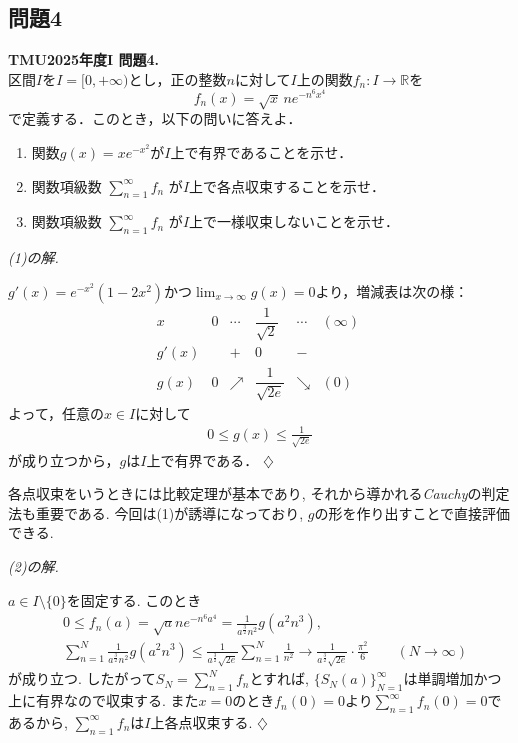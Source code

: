 \documentclass[titlepage]{jsarticle}
\numberwithin{equation}{section}
\newcommand{\R}{\mathbb{R}}%
\newenvironment{kaitou}[1][解]{%
\begin{proofbox}%
\textit{#1. }\ignorespaces
}{%
\hfill$\diamondsuit$%
\end{proofbox}%
}
\begin{document}
\subsection{問題4}
\begin{problem}
\textbf{TMU2025年度I 問題4.}\\
区間$I$を$I=[0,+\infty)$とし，正の整数$n$に対して$I$上の関数$f_n:I\to\R$を
\[
f_n(x)=\sqrt{x}\,n e^{-n^6x^4}
\]
で定義する．このとき，以下の問いに答えよ．

\begin{enumerate}[label=(\arabic*)]
    \item 関数$g(x)=xe^{-x^2}$が$I$上で有界であることを示せ．
    
    \item 関数項級数
    $\displaystyle{\sum_{n=1}^{\infty}f_n}$
    が$I$上で各点収束することを示せ．
    
    \item 関数項級数
    $\displaystyle{\sum_{n=1}^{\infty}f_n
    }$
    が$I$上で一様収束しないことを示せ．
\end{enumerate}
\end{problem}
\begin{kaitou}[(1)の解]
$g'(x)=e^{-x^2}(1-2x^2)$かつ$\displaystyle\lim_{x\to\infty}g(x)=0$より，増減表は次の様：
\[
\begin{array}{c||c|c|c|c|c}
x
& 0
& \cdots
& \dfrac{1}{\sqrt{2}}
& \cdots
& (\infty)\ 
\\ \hline
g'(x)
&
& +
& 0
& -
&
\\ \hline
g(x)
& 0
& \nearrow
& \dfrac{1}{\sqrt{2e}}
& \searrow
& (0)
\end{array}
\]
よって，任意の$x\in I$に対して
\begin{align}
0\leq g(x)\leq \frac{1}{\sqrt{2e}} \label{tmu2025-4a}
\end{align}
が成り立つから，$g$は$I$上で有界である．
\end{kaitou}
各点収束をいうときには比較定理が基本であり, それから導かれる\textit{Cauchy}の判定法も重要である. 今回は(1)が誘導になっており, $g$の形を作り出すことで直接評価できる.
\begin{kaitou}[(2)の解]
$a \in I \setminus \{0\}$を固定する. このとき
\begin{align*}
&0 \le f_n(a) = \sqrt{a}ne^{-n^6a^4} = \frac{1}{a^\frac{3}{2}n^2}g(a^2n^3), \\
&\sum_{n = 1}^N \frac{1}{a^\frac{3}{2}n^2}g(a^2n^3) \le \frac{1}{a^\frac{3}{2}\sqrt{2e}} \sum_{n = 1}^N \frac{1}{n^2} \to \frac{1}{a^\frac{3}{2}\sqrt{2e}}\cdot \frac{\pi^2}{6}\qquad(N \to \infty)
\end{align*}
が成り立つ. したがって$S_N = \displaystyle{\sum_{n=1}^{N}f_n}$とすれば, $\{S_N(a)\}_{N=1}^\infty$は単調増加かつ上に有界なので収束する. また$x = 0$のとき$f_n(0) = 0$より$\displaystyle{\sum_{n=1}^{\infty}f_n(0) = 0}$であるから, $\displaystyle{\sum_{n=1}^{\infty}f_n}$は$I$上各点収束する.
\end{kaitou}
\end{document}
